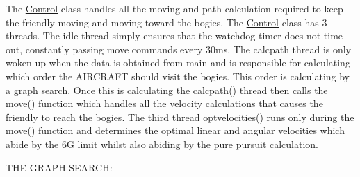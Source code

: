 The \hyperlink{classControl}{Control} class handles all the moving and path calculation required to keep the friendly moving and moving toward the bogies. The \hyperlink{classControl}{Control} class has 3 threads. The idle thread simply ensures that the watchdog timer does not time out, constantly passing move commands every 30ms. The calcpath thread is only woken up when the data is obtained from main and is responsible for calculating which order the A\+I\+R\+C\+R\+A\+FT should visit the bogies. This order is calculating by a graph search. Once this is calculating the calcpath() thread then calls the move() function which handles all the velocity calculations that causes the friendly to reach the bogies. The third thread optvelocities() runs only during the move() function and determines the optimal linear and angular velocities which abide by the 6G limit whilst also abiding by the pure pursuit calculation.

T\+HE G\+R\+A\+PH S\+E\+A\+R\+CH\+:

